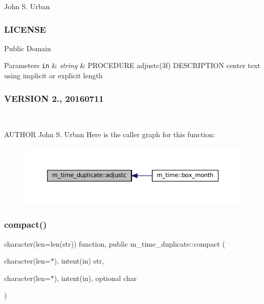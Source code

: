 John S. Urban \subsubsection*{L\+I\+C\+E\+N\+SE}

Public Domain


\begin{DoxyParams}[1]{Parameters}
\mbox{\tt in}  & {\em string} & P\+R\+O\+C\+E\+D\+U\+RE adjustc(3f) D\+E\+S\+C\+R\+I\+P\+T\+I\+ON center text using implicit or explicit length \subsubsection*{V\+E\+R\+S\+I\+ON 2., 20160711}\\
\hline
\end{DoxyParams}
A\+U\+T\+H\+OR John S. Urban Here is the caller graph for this function\+:\nopagebreak
\begin{figure}[H]
\begin{center}
\leavevmode
\includegraphics[width=350pt]{namespacem__time__duplicate_a487dbbb116d2c7022b39869d4990cf6f_icgraph}
\end{center}
\end{figure}
\mbox{\label{namespacem__time__duplicate_a20fc022f66383c65302e990c00432f38}} 
\subsubsection{\texorpdfstring{compact()}{compact()}}
{\footnotesize\ttfamily character(len=len(str)) function, public m\+\_\+time\+\_\+duplicate\+::compact (\begin{DoxyParamCaption}\item[{character(len=$\ast$), intent(in)}]{str,  }\item[{character(len=$\ast$), intent(in), optional}]{char }\end{DoxyParamCaption})}



